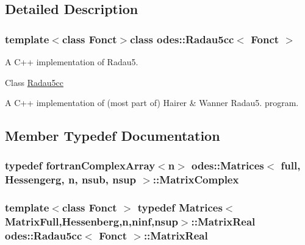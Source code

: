 \subsection{Detailed Description}
\subsubsection*{template$<$class Fonct$>$class odes\-::\-Radau5cc$<$ Fonct $>$}

A C++ implementation of Radau5. 

Class \hyperlink{classodes_1_1Radau5cc}{Radau5cc}

A C++ implementation of (most part of) Hairer \& Wanner Radau5. program. 

\subsection{Member Typedef Documentation}
\hypertarget{classodes_1_1Matrices_aa1313b5ab7fdab6f5320c8d5aa3bfc24}{
\subsubsection[{Matrix\-Complex}]{\setlength{\rightskip}{0pt plus 5cm}typedef {\bf fortran\-Complex\-Array}$<${\bf n}$>$ {\bf odes\-::\-Matrices}$<$ full, Hessengerg, {\bf n}, nsub, {\bf nsup} $>$\-::{\bf Matrix\-Complex}\hspace{0.3cm}{\ttfamily [inherited]}}}\label{classodes_1_1Matrices_aa1313b5ab7fdab6f5320c8d5aa3bfc24}
\hypertarget{classodes_1_1Radau5cc_a8ef067b8852403d48d8528f601a4626a}{
\subsubsection[{Matrix\-Real}]{\setlength{\rightskip}{0pt plus 5cm}template$<$class Fonct $>$ typedef {\bf Matrices}$<${\bf Matrix\-Full},{\bf Hessenberg},{\bf n},{\bf ninf},{\bf nsup}$>$\-::{\bf Matrix\-Real} {\bf odes\-::\-Radau5cc}$<$ Fonct $>$\-::{\bf Matrix\-Real}\hspace{0.3cm}{\ttfamily [private]}}}\label{classodes_1_1Radau5cc_a8ef067b8852403d48d8528f601a4626a}


